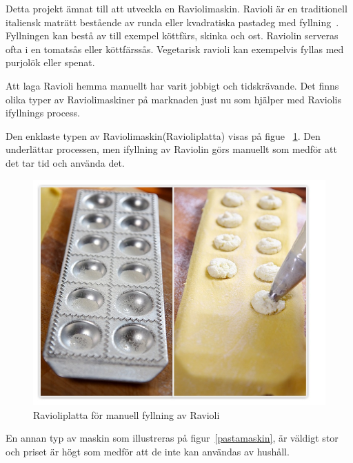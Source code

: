 Detta projekt ämnat till att utveckla en Raviolimaskin. Ravioli är en traditionell italiensk maträtt bestående av runda eller kvadratiska pastadeg med fyllning~\cite{engproc}. Fyllningen kan bestå av till exempel köttfärs, skinka och ost. Raviolin serveras ofta i en tomatsås eller köttfärssås. Vegetarisk ravioli kan exempelvis fyllas med purjolök eller spenat.

Att laga Ravioli hemma manuellt har varit jobbigt och tidskrävande. Det finns olika typer av Raviolimaskiner på marknaden just nu som hjälper med Raviolis ifyllnings process. 

Den enklaste typen av Raviolimaskin(Ravioliplatta) visas på figue ~\ref{ravioliplatta}. Den underlättar processen, men ifyllning av Raviolin görs manuellt som medför att det tar tid och använda det.

 
	\begin{figure}[h]
		\begin{center}
			\includegraphics[scale=0.5]{images/raviolimoldwithfilling.jpg}
			\caption{Ravioliplatta för manuell fyllning av Ravioli}
			\label{ravioliplatta}	
		\end{center}
	\end{figure}
En annan typ av maskin som illustreras på figur~\ref{pastamaskin}, är väldigt stor och priset är högt som medför att de inte kan användas av hushåll.

